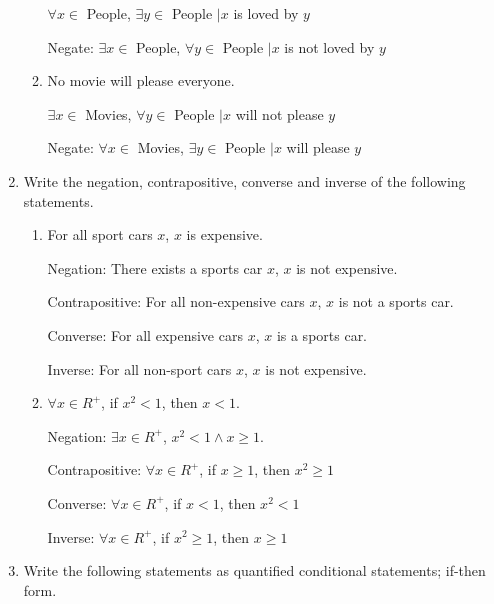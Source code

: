 \documentclass[12pt,letterpaper,titlepage]{article}
\begin{document}
\begin{raggedright}
\begin{enumerate}
\begin{enumerate}[label=(\alph*)]
	  $\forall x \in$ People, $\exists y \in$ People $| x$ is loved by $y$
	  
	  Negate: $\exists x \in$ People, $\forall y \in$ People $| x$ is not loved by $y$

    \item No movie will please everyone.

	  $\exists x \in$ Movies, $\forall y \in$ People $| x$ will not please $y$
	  
	  Negate: $\forall x \in$ Movies, $\exists y \in$ People $| x$ will please $y$

  \end{enumerate}
  

\item Write the negation, contrapositive, converse and inverse of the following statements.

  \begin{enumerate}[label=(\alph*)]
    \item For all sport cars $x$, $x$ is expensive.

	  Negation: There exists a sports car $x$, $x$ is not expensive.
	  
	  Contrapositive: For all non-expensive cars $x$, $x$ is not a sports car. 
	  
	  Converse: For all expensive cars $x$, $x$ is a sports car.
	  
	  Inverse: For all non-sport cars $x$, $x$ is not expensive.
    
    \item $\forall x \in R^+$, if $x^2 < 1$, then $x < 1$.
    
   	  Negation: $\exists x \in R^+$, $x^2 < 1 \land x \geq 1$.
	  
	  Contrapositive: $\forall x \in R^+$, if $x \geq 1$, then $x^2 \geq 1$
	  
	  Converse: $\forall x \in R^+$, if $x < 1$, then $x^2 < 1$
	  
	  Inverse: $\forall x \in R^+$, if $x^2 \geq 1$, then $x \geq 1$

  \end{enumerate}
  
\pagebreak

\item Write the following statements as quantified conditional statements; if-then form.


\end{enumerate}
\end{raggedright}
\end{document}
